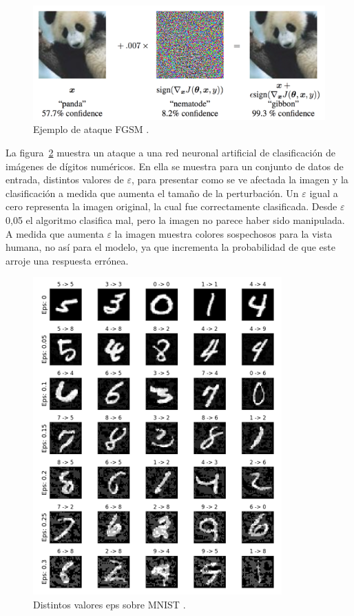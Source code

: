 \begin{figure}[th]
\centering
\includegraphics [scale = 0.95] {Figures/figura_18.PNG}
\decoRule
\caption[FGSM]{Ejemplo de ataque FGSM \parencite{r3}.}
\label{fig:18}
\end{figure}

La figura~\ref{fig:19} muestra un ataque a una red neuronal artificial de clasificación de imágenes de dígitos numéricos. En ella se muestra para un conjunto de datos de entrada, distintos valores de $\varepsilon$, para presentar como se ve afectada la imagen y la clasificación a medida que aumenta el tamaño de la perturbación. Un $\varepsilon$ igual a cero representa la imagen original, la cual fue correctamente clasificada. Desde $\varepsilon$ 0,05 el algoritmo clasifica mal, pero la imagen no parece haber sido manipulada. A medida que aumenta $\varepsilon$ la imagen muestra colores sospechosos para la vista humana, no así para el modelo, ya que incrementa la probabilidad de que este arroje una respuesta errónea.

\begin{figure}[th]
\centering
\includegraphics [scale = 1] {Figures/figura_19.PNG}
\decoRule
\caption[MNIST]{Distintos valores eps sobre MNIST \parencite{r3}.}
\label{fig:19}
\end{figure}



